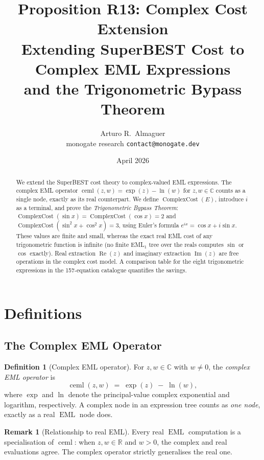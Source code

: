 \documentclass[12pt,a4paper]{article}
\title{Proposition R13: Complex Cost Extension\\[6pt]
       \large Extending SuperBEST Cost to Complex EML Expressions\\
       and the Trigonometric Bypass Theorem}
\author{Arturo R.\ Almaguer\\
\small monogate research \quad \texttt{contact@monogate.dev}}
\date{April 2026}
\theoremstyle{definition}
\newtheorem{definition}[theorem]{Definition}
\newtheorem{remark}[theorem]{Remark}
\newcommand{\EML}{\operatorname{EML}}
\newcommand{\ceml}{\operatorname{ceml}}
\newcommand{\CC}{\operatorname{ComplexCost}}
\begin{document}
\maketitle

\begin{abstract}
We extend the SuperBEST cost theory to complex-valued EML expressions.
The complex EML operator $\ceml(z,w) = \exp(z) - \ln(w)$ for $z, w \in \mathbb{C}$
counts as a single node, exactly as its real counterpart.
We define $\CC(E)$, introduce $i$ as a terminal, and prove the
\emph{Trigonometric Bypass Theorem}: $\CC(\sin x) = \CC(\cos x) = 2$ and
$\CC(\sin^2 x + \cos^2 x) = 3$, using Euler's formula
$e^{ix} = \cos x + i\sin x$.
These values are finite and small, whereas the exact real EML cost of any
trigonometric function is infinite (no finite EML$_1$ tree over the reals
computes $\sin$ or $\cos$ exactly).
Real extraction $\operatorname{Re}(z)$ and imaginary extraction
$\operatorname{Im}(z)$ are free operations in the complex cost model.
A comparison table for the eight trigonometric expressions in the
157-equation catalogue quantifies the savings.
\end{abstract}

\tableofcontents
\bigskip

\section{Definitions}
\label{sec:definitions}

\subsection{The Complex EML Operator}

\begin{definition}[Complex EML operator]
\label{def:ceml}
For $z, w \in \mathbb{C}$ with $w \neq 0$, the \emph{complex EML operator} is
\[
  \ceml(z, w) \;=\; \exp(z) \;-\; \ln(w),
\]
where $\exp$ and $\ln$ denote the principal-value complex exponential and
logarithm, respectively.
A complex \ceml{} node in an expression tree counts as \emph{one node},
exactly as a real $\EML$ node does.
\end{definition}

\begin{remark}[Relationship to real EML]
Every real $\EML$ computation is a specialisation of $\ceml$: when
$z, w \in \mathbb{R}$ and $w > 0$, the complex and real evaluations agree.
The complex operator strictly generalises the real one.
\end{remark}
\end{document}
